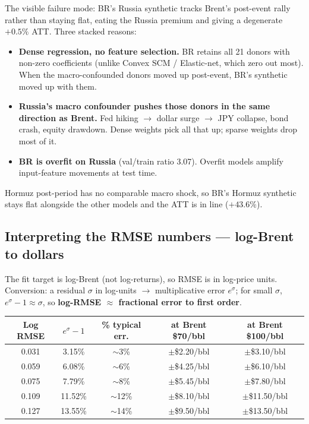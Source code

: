 \documentclass[11pt,a4paper]{article}
\begin{document}
The visible failure mode: BR's Russia synthetic tracks Brent's post-event rally rather than staying flat, eating the Russia premium and giving a degenerate $+0.5\%$ ATT. Three stacked reasons:
\begin{itemize}\setlength\itemsep{0.05em}
  \item \textbf{Dense regression, no feature selection.} BR retains all 21 donors with non-zero coefficients (unlike Convex SCM / Elastic-net, which zero out most). When the macro-confounded donors moved up post-event, BR's synthetic moved up with them.
  \item \textbf{Russia's macro confounder pushes those donors in the same direction as Brent.} Fed hiking $\to$ dollar surge $\to$ JPY collapse, bond crash, equity drawdown. Dense weights pick all that up; sparse weights drop most of it.
  \item \textbf{BR is overfit on Russia} (val/train ratio 3.07). Overfit models amplify input-feature movements at test time.
\end{itemize}
Hormuz post-period has no comparable macro shock, so BR's Hormuz synthetic stays flat alongside the other models and the ATT is in line ($+43.6\%$).

\subsection{Interpreting the RMSE numbers --- log-Brent to dollars}

The fit target is log-Brent (not log-returns), so RMSE is in log-price units. Conversion: a residual $\sigma$ in log-units $\to$ multiplicative error $e^\sigma$; for small $\sigma$, $e^\sigma - 1 \approx \sigma$, so \textbf{log-RMSE $\approx$ fractional error to first order}.

\begin{center}
\begin{tabular}{@{}c c c c c@{}}
  \toprule
  Log RMSE & $e^\sigma - 1$ & \% typical err. & at Brent \$70/bbl & at Brent \$100/bbl \\
  \midrule
  0.031 & 3.15\%  & $\sim$3\%  & $\pm$\$2.20/bbl  & $\pm$\$3.10/bbl \\
  0.059 & 6.08\%  & $\sim$6\%  & $\pm$\$4.25/bbl  & $\pm$\$6.10/bbl \\
  0.075 & 7.79\%  & $\sim$8\%  & $\pm$\$5.45/bbl  & $\pm$\$7.80/bbl \\
  0.109 & 11.52\% & $\sim$12\% & $\pm$\$8.10/bbl  & $\pm$\$11.50/bbl \\
  0.127 & 13.55\% & $\sim$14\% & $\pm$\$9.50/bbl  & $\pm$\$13.50/bbl \\
  \bottomrule
\end{tabular}
\end{center}
\end{document}
